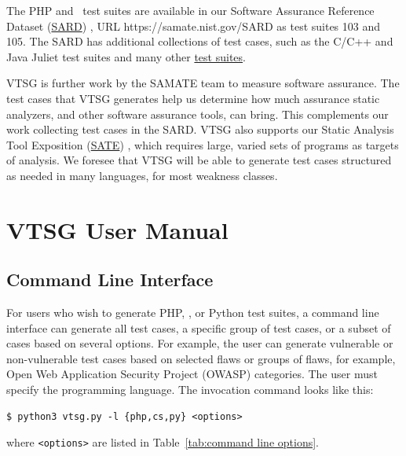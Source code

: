 The PHP and \CSharp\ test suites are
available in our Software Assurance Reference Dataset
(\href{https://samate.nist.gov/SARD}{SARD}) \cite{SARD2018},
URL https://samate.nist.gov/SARD as test suites 103 and 105.
The SARD has additional collections of test cases, such as the C/C++ and Java Juliet
test suites and many other
\href{https://samate.nist.gov/SARD/testsuite.php}{test suites}.

VTSG is further work by the SAMATE team to measure software assurance.  The test
cases that VTSG generates help us determine how much assurance static analyzers,
and other software assurance tools, can bring.  This complements our work collecting
test cases in the SARD.  VTSG also supports our Static Analysis Tool
Exposition
(\href{https://www.nist.gov/itl/ssd/software-quality-group/samate/static-analysis-tool-exposition-sate}{SATE})
\cite{SATEIV2023}, which requires large, varied sets of programs as targets of
analysis.  We foresee that VTSG will be able to generate test cases structured as
needed in many languages, for most weakness classes.

\section{VTSG User Manual}
\label{sec:user manual}

\subsection{Command Line Interface}
\label{sec:command line interface}

For users who wish to generate PHP, \CSharp, or Python test suites, a command line
interface
can generate all test cases, a specific group of test cases, or a subset of
cases based on several
options.  For example, the user can generate vulnerable or non-vulnerable test cases
based on selected flaws or groups of flaws, for example,
Open Web Application Security Project (OWASP) categories.
The user must specify the
programming language.  The invocation command looks like this:
\begin{verbatim}
$ python3 vtsg.py -l {php,cs,py} <options>
\end{verbatim}
\newcommand{\texlangle}{$\langle$}
\newcommand{\texrangle}{$\rangle$}
where \verb|<options>| are listed in
Table~\ref{tab:command line options}.

